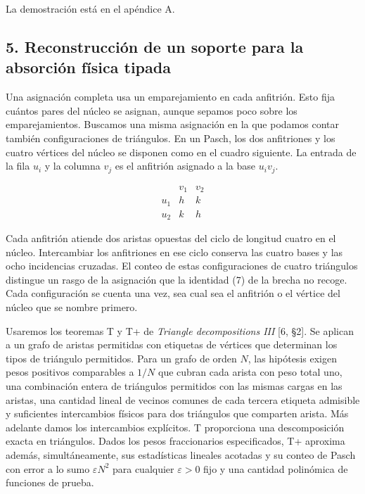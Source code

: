 \documentclass[spanish,11pt,a4paper]{article}
\begin{document}
La demostración está en el apéndice A.

\subsection{5. Reconstrucción de un soporte para la absorción física tipada}\label{reconstrucciuxf3n-de-un-soporte-para-la-absorciuxf3n-fuxedsica-tipada}

Una asignación completa usa un emparejamiento en cada anfitrión. Esto fija cuántos pares del núcleo se asignan, aunque sepamos poco sobre los emparejamientos. Buscamos una misma asignación en la que podamos contar también configuraciones de triángulos. En un Pasch, los dos anfitriones y los cuatro vértices del núcleo se disponen como en el cuadro siguiente. La entrada de la fila \(u_i\) y la columna \(v_j\) es el anfitrión asignado a la base \(u_iv_j\).

\[\begin{array}{c|cc}
       &v_1&v_2\\ \hline
 u_1   &h&k\\
 u_2   &k&h
\end{array}\]

Cada anfitrión atiende dos aristas opuestas del ciclo de longitud cuatro en el núcleo. Intercambiar los anfitriones en ese ciclo conserva las cuatro bases y las ocho incidencias cruzadas. El conteo de estas configuraciones de cuatro triángulos distingue un rasgo de la asignación que la identidad (7) de la brecha no recoge. Cada configuración se cuenta una vez, sea cual sea el anfitrión o el vértice del núcleo que se nombre primero.

Usaremos los teoremas T y T+ de \emph{Triangle decompositions III} {[}6, §2{]}. Se aplican a un grafo de aristas permitidas con etiquetas de vértices que determinan los tipos de triángulo permitidos. Para un grafo de orden \(N\), las hipótesis exigen pesos positivos comparables a \(1/N\) que cubran cada arista con peso total uno, una combinación entera de triángulos permitidos con las mismas cargas en las aristas, una cantidad lineal de vecinos comunes de cada tercera etiqueta admisible y suficientes intercambios físicos para dos triángulos que comparten arista. Más adelante damos los intercambios explícitos. T proporciona una descomposición exacta en triángulos. Dados los pesos fraccionarios especificados, T+ aproxima además, simultáneamente, sus estadísticas lineales acotadas y su conteo de Pasch con error a lo sumo \(\varepsilon N^2\) para cualquier \(\varepsilon>0\) fijo y una cantidad polinómica de funciones de prueba.
\end{document}
